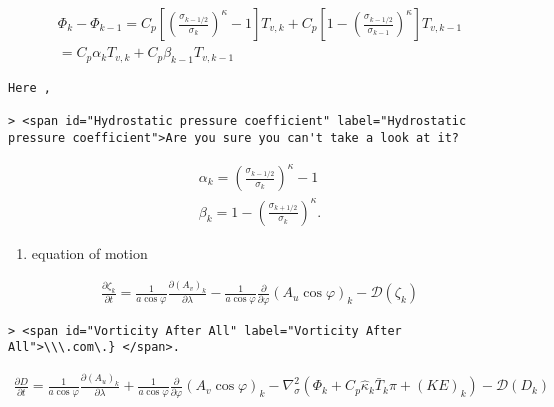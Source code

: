 \begin{eqnarray}
 \Phi_k - \Phi_{k-1} 
   =  C_{p}
   \left[ \left( \frac{ \sigma_{k-1/2} }{ \sigma_k } \right)^{\kappa}
          - 1 \right] T_{v,k} 
       + C_{p}
   \left[ 1- 
         \left( \frac{ \sigma_{k-1/2} }{ \sigma_{k-1} } \right)^{\kappa}
              \right] T_{v,k-1} \\
   =    C_{p} \alpha_k T_{v,k} + C_{p} \beta_{k-1} T_{v,k-1}
\end{eqnarray}

\begin{verbatim}
Here ,

> <span id="Hydrostatic pressure coefficient" label="Hydrostatic pressure coefficient">Are you sure you can't take a look at it?
\end{verbatim}

\begin{eqnarray}
 \alpha_k   =  \left( \frac{ \sigma_{k-1/2} }
                               { \sigma_k } \right)^{\kappa} -1 \\
 \beta_k    =  1- \left( \frac{ \sigma_{k+1/2} }
                               { \sigma_k } \right)^{\kappa} .
\end{eqnarray}

\begin{enumerate}
\def\labelenumi{\arabic{enumi}.}
\setcounter{enumi}{2}
\tightlist
\item
  equation of motion
\end{enumerate}

\begin{eqnarray}
  \frac{\partial \zeta_k}{\partial t} 
        =   \frac{1}{a\cos\varphi} 
            \frac{\partial (A_v)_k}{\partial \lambda}
          - \frac{1}{a\cos\varphi} 
            \frac{\partial }{\partial \varphi} (A_u \cos\varphi)_k
          - {\mathcal D}(\zeta_k) 
\end{eqnarray}

\begin{verbatim}
> <span id="Vorticity After All" label="Vorticity After All">\\\.com\.} </span>.
\end{verbatim}

\begin{eqnarray}
  \frac{\partial D}{\partial t} 
        =   \frac{1}{a\cos\varphi} 
            \frac{\partial (A_u)_k}{\partial \lambda}
          + \frac{1}{a\cos\varphi} 
            \frac{\partial }{\partial \varphi} (A_v \cos\varphi)_k
          - \nabla^{2}_{\sigma}
           ( \Phi_k + C_{p} \hat{\kappa}_k \bar{T}_k \pi 
             + ({\mathit KE})_k )
          - {\mathcal D}(D_k) 
\end{eqnarray}

